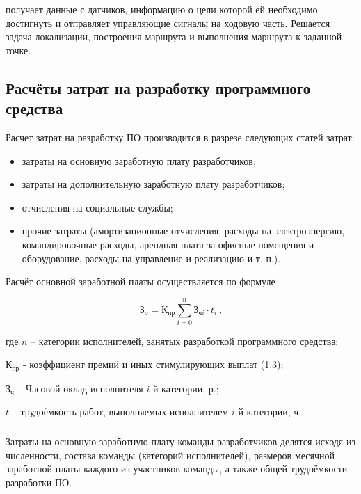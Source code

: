 \appname{} получает данные с датчиков, информацию о цели которой ей 
необходимо достигнуть  и отправляет управляющие сигналы на ходовую часть. 
Решается задача локализации, построения маршрута и выполнения маршрута 
к заданной точке. 

\subsection{Расчёты затрат на разработку программного средства}

Расчет затрат на разработку ПО производится в разрезе следующих статей затрат:

\begin{itemize}
	\item затраты на основную заработную плату разработчиков;
	\item затраты на дополнительную заработную плату разработчиков;
	\item отчисления на социальные службы;
	\item прочие затраты (амортизационные отчисления, расходы на 
		электроэнергию, командировочные расходы, арендная плата за офисные
		помещения и оборудование, расходы на управление и реализацию и т. п.).
\end{itemize}

Расчёт основной заработной платы осуществляется по формуле

\begin{equation}
	\label{eq:зарплата}
	\text{З}_o = \text{К}_{\text{пр}}\sum_{i=0}^{n} \text{З}_{\text{ч}i} \cdot t_i
	\ \text{,}
\end{equation}


\begin{explanationx}
	\item[где]  $n$  -- категории исполнителей, занятых разработкой
		программного средства;
	\item $\text{К}_\text{пр}$ - коэффициент премий и иных стимулирующих
		выплат (\num{1.3});
	\item $\text{З}_\text{ч}$ --  Часовой оклад исполнителя $i\text{-й}$
		категории, р.;
	\item $t$  -- трудоёмкость работ, выполняемых исполнителем $i\text{-й}$
		категории, ч.
\end{explanationx}


\subsubsection{} Затраты на основную заработную плату команды разработчиков
делятся исходя из численности, состава команды (категорий исполнителей), 
размеров месячной заработной платы каждого из участников команды, а также
общей трудоёмкости разработки ПО. 

